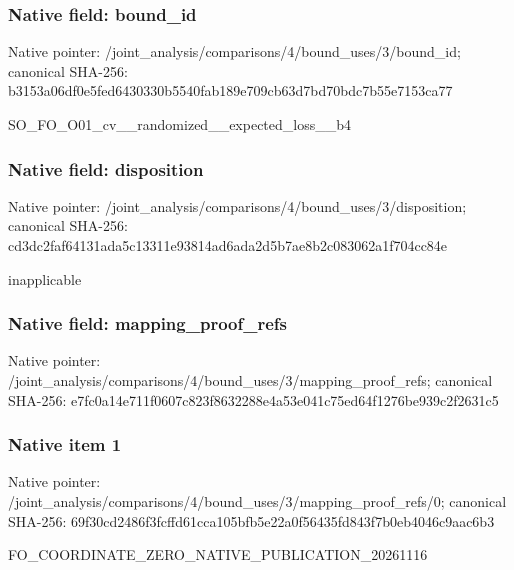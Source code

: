 \documentclass[10pt,a4paper]{article}
\begin{document}
\subsubsection{Native field: bound\_\allowbreak{}id}
Native pointer: /joint\_\allowbreak{}analysis/comparisons/4/bound\_\allowbreak{}uses/3/bound\_\allowbreak{}id; canonical SHA-256: b3153a06df0e5fed6430330b5540fab189e709cb63d7bd70bdc7b55e7153ca77

\begingroup\raggedright\sloppy SO\_\allowbreak{}FO\_\allowbreak{}O01\_\allowbreak{}cv\_\allowbreak{}\_\allowbreak{}randomized\_\allowbreak{}\_\allowbreak{}expected\_\allowbreak{}loss\_\allowbreak{}\_\allowbreak{}b4\par\endgroup

\subsubsection{Native field: disposition}
Native pointer: /joint\_\allowbreak{}analysis/comparisons/4/bound\_\allowbreak{}uses/3/disposition; canonical SHA-256: cd3dc2faf64131ada5c13311e93814ad6ada2d5b7ae8b2c083062a1f704cc84e

\begingroup\raggedright\sloppy inapplicable\par\endgroup

\subsubsection{Native field: mapping\_\allowbreak{}proof\_\allowbreak{}refs}
Native pointer: /joint\_\allowbreak{}analysis/comparisons/4/bound\_\allowbreak{}uses/3/mapping\_\allowbreak{}proof\_\allowbreak{}refs; canonical SHA-256: e7fc0a14e711f0607c823f8632288e4a53e041c75ed64f1276be939c2f2631c5

\subsubsection{Native item 1}
Native pointer: /joint\_\allowbreak{}analysis/comparisons/4/bound\_\allowbreak{}uses/3/mapping\_\allowbreak{}proof\_\allowbreak{}refs/0; canonical SHA-256: 69f30cd2486f3fcffd61cca105bfb5e22a0f56435fd843f7b0eb4046c9aac6b3

\begingroup\raggedright\sloppy FO\_\allowbreak{}COORDINATE\_\allowbreak{}ZERO\_\allowbreak{}NATIVE\_\allowbreak{}PUBLICATION\_\allowbreak{}20261116\par\endgroup
\end{document}

